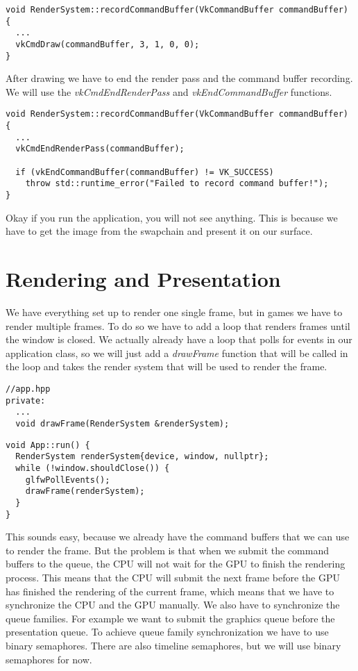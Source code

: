 \documentclass[12pt]{report} \usepackage{preamble}
\begin{document}
\begin{lstlisting}[Language=C++]
void RenderSystem::recordCommandBuffer(VkCommandBuffer commandBuffer) {
  ...
  vkCmdDraw(commandBuffer, 3, 1, 0, 0);
}
\end{lstlisting}

After drawing we have to end the render pass and the command buffer recording. We will use the \textit{vkCmdEndRenderPass} and
\textit{vkEndCommandBuffer} functions.

\begin{lstlisting}[Language=C++]
void RenderSystem::recordCommandBuffer(VkCommandBuffer commandBuffer) {
  ...
  vkCmdEndRenderPass(commandBuffer);

  if (vkEndCommandBuffer(commandBuffer) != VK_SUCCESS)
    throw std::runtime_error("Failed to record command buffer!");
}
\end{lstlisting}

Okay if you run the application, you will not see anything. This is because we have to get the image from the swapchain and
present it on our surface.

\section{Rendering and Presentation}

We have everything set up to render one single frame, but in games we have to render multiple frames. To do so we have to
add a loop that renders frames until the window is closed. We actually already have a loop that polls for events in our
application class, so we will just add a \textit{drawFrame} function that will be called in the loop and takes the
render system that will be used to render the frame.

\begin{lstlisting}[Language=C++]
//app.hpp
private:
  ...
  void drawFrame(RenderSystem &renderSystem);
\end{lstlisting}

\begin{lstlisting}[Language=C++]
void App::run() {
  RenderSystem renderSystem{device, window, nullptr};
  while (!window.shouldClose()) {
    glfwPollEvents();
    drawFrame(renderSystem);
  }
}
\end{lstlisting}

This sounds easy, because we already have the command buffers that we can use to render the frame. But the problem is that
when we submit the command buffers to the queue, the CPU will not wait for the GPU to finish the rendering process. This means that
the CPU will submit the next frame before the GPU has finished the rendering of the current frame, which means that we have
to synchronize the CPU and the GPU manually. We also have to synchronize the queue families. For example we want to submit the
graphics queue before the presentation queue. To achieve queue family synchronization we have to use binary semaphores. There are
also timeline semaphores, but we will use binary semaphores for now.
\end{document}
